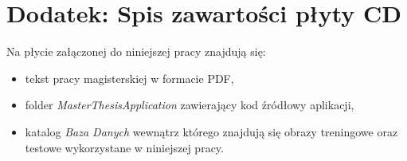 \chapter{Dodatek: Spis zawartości płyty CD}

Na płycie załączonej do niniejszej pracy znajdują się:

\begin{itemize}
	\item tekst pracy magisterskiej w formacie PDF,
	\item folder \textit{MasterThesisApplication} zawierający kod źródłowy aplikacji,
	\item katalog \textit{Baza Danych} wewnątrz którego znajdują się obrazy treningowe oraz testowe wykorzystane w niniejszej pracy.
\end{itemize}